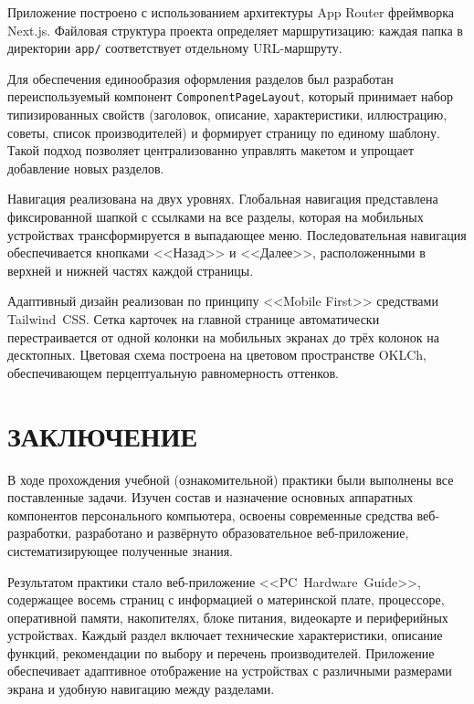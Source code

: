 \documentclass[14pt,a4paper]{extarticle}
\begin{document}
Приложение построено с использованием архитектуры App Router фреймворка Next.js. Файловая структура проекта определяет маршрутизацию: каждая папка в директории \texttt{app/} соответствует отдельному URL-маршруту.

Для обеспечения единообразия оформления разделов был разработан переиспользуемый компонент \texttt{ComponentPageLayout}, который принимает набор типизированных свойств (заголовок, описание, характеристики, иллюстрацию, советы, список производителей) и формирует страницу по единому шаблону. Такой подход позволяет централизованно управлять макетом и упрощает добавление новых разделов.

Навигация реализована на двух уровнях. Глобальная навигация представлена фиксированной шапкой с ссылками на все разделы, которая на мобильных устройствах трансформируется в выпадающее меню. Последовательная навигация обеспечивается кнопками <<Назад>> и <<Далее>>, расположенными в верхней и нижней частях каждой страницы.

Адаптивный дизайн реализован по принципу <<Mobile First>> средствами Tailwind~CSS. Сетка карточек на главной странице автоматически перестраивается от одной колонки на мобильных экранах до трёх колонок на десктопных. Цветовая схема построена на цветовом пространстве OKLCh, обеспечивающем перцептуальную равномерность оттенков.

\newpage
\section*{ЗАКЛЮЧЕНИЕ}

В ходе прохождения учебной (ознакомительной) практики были выполнены все поставленные задачи. Изучен состав и назначение основных аппаратных компонентов персонального компьютера, освоены современные средства веб-разработки, разработано и развёрнуто образовательное веб-приложение, систематизирующее полученные знания.

Результатом практики стало веб-приложение <<PC~Hardware~Guide>>, содержащее восемь страниц с информацией о материнской плате, процессоре, оперативной памяти, накопителях, блоке питания, видеокарте и периферийных устройствах. Каждый раздел включает технические характеристики, описание функций, рекомендации по выбору и перечень производителей. Приложение обеспечивает адаптивное отображение на устройствах с различными размерами экрана и удобную навигацию между разделами.
\end{document}
